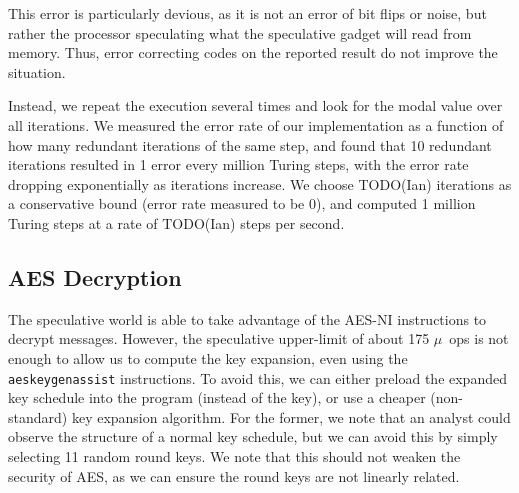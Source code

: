 This error is particularly devious, as it is not an
error of bit flips or noise, but rather the processor speculating what the
speculative gadget will read from memory. Thus, error correcting codes on
the reported result do not improve the situation.


Instead, we
repeat the execution several times and look for the modal value over all
iterations. We measured the
error rate of our implementation as a function of how many redundant iterations
of the same step, and found that 10 redundant iterations resulted in 1 error every
million Turing steps, with the error rate dropping exponentially as iterations
increase. We choose TODO(Ian) iterations as a conservative bound (error rate measured
to be 0), and computed 1 million Turing steps at a rate of TODO(Ian)
steps per second.






\subsection{AES Decryption}
\label{subsec:impl-aes}
The speculative world is able to take advantage of the AES-NI instructions to
decrypt messages. However, the speculative upper-limit of about 175 $\mu$~ops is not
enough to allow us to compute the key expansion, even using the
\texttt{aeskeygenassist} instructions. To avoid this, we can either preload the
expanded key schedule into the program (instead of the key), or use a cheaper
(non-standard) key expansion algorithm.
For the former, we note that an analyst
could observe the structure of a normal key schedule,
but we can avoid this by simply selecting 11 random round keys.
We note that
this should not weaken the security of AES, as we can ensure the round keys are
not linearly related.


%

